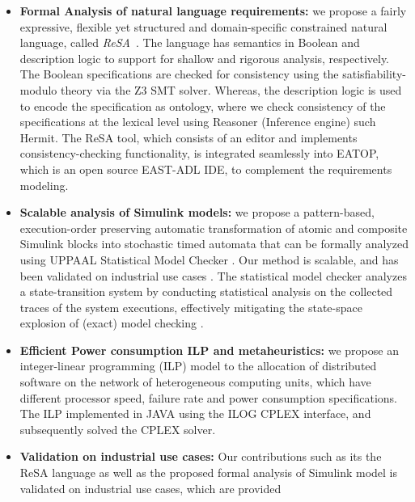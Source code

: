 \begin{itemize}
\item \textbf{Formal Analysis of natural language requirements:}  we propose a fairly expressive, flexible yet structured and domain-specific constrained natural language, called \textit{ReSA}~\cite{resatool}\cite{Mahmud2015ReSA:Systems}. The language has semantics in Boolean and description logic to support for shallow and rigorous analysis, respectively. The Boolean specifications are checked for consistency using the satisfiability-modulo theory via the Z3 SMT solver. Whereas, the description logic is used to encode the specification as ontology, where we check consistency of the specifications at the lexical level using Reasoner (Inference engine) such Hermit. The ReSA tool, which consists of an editor and implements consistency-checking functionality, is integrated seamlessly into EATOP, which is an open source EAST-ADL IDE, to complement the requirements modeling. 

\item \textbf{Scalable analysis of Simulink models:} we propose a pattern-based, execution-order preserving automatic transformation of atomic and composite Simulink blocks into stochastic timed automata that can be formally analyzed using UPPAAL Statistical Model Checker \cite{Bulychev2012UPPAAL-SMC:Automata}. Our method is scalable, and has been validated on industrial use cases \cite{Filipovikj2016SimulinkSystems}. The statistical model checker analyzes a state-transition system by conducting statistical analysis on the collected traces of the system executions, effectively mitigating the state-space explosion of (exact) model checking \cite{Legay2010StatisticalOverview}. 

\item \textbf{Efficient Power consumption ILP and metaheuristics:} we propose an integer-linear programming (ILP) model to the allocation of distributed software on the network of heterogeneous computing units, which have different processor speed, failure rate and power consumption specifications. The ILP implemented in JAVA using the ILOG CPLEX interface, and subsequently solved the CPLEX solver.
\item \textbf{Validation on industrial use cases: } 
Our contributions such as its the ReSA language as well as the proposed formal analysis of Simulink model is validated on industrial use cases, which are provided
\end{itemize}


